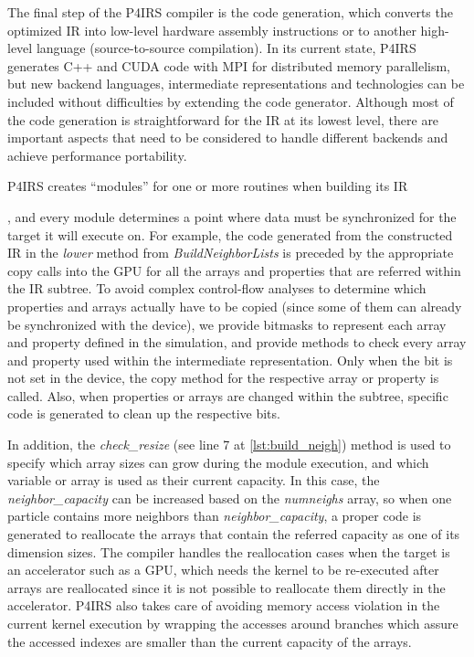 \documentclass[Afour,sageh,times]{sagej}
\newcommand{\RMchange}[1]{{\color{blue} #1}}
\begin{document}
\RMchange{
The final step of the P4IRS compiler is the code generation, which converts the optimized \ac{IR} into low-level hardware assembly instructions or to another high-level language (source-to-source compilation).
In its current state, P4IRS generates C++ and CUDA code with MPI for distributed memory parallelism, but new backend languages, intermediate representations and technologies can be included without difficulties by extending the code generator.
Although most of the code generation is straightforward for the \ac{IR} at its lowest level, there are important aspects that need to be considered to handle different backends and achieve performance portability.

P4IRS creates ``modules'' for one or more routines when building its IR}, and every module determines a point where data must be synchronized for the target it will execute on.
For example, the code generated from the constructed IR in the \emph{lower} method from \emph{BuildNeighborLists} is preceded by the appropriate copy calls into the GPU for all the arrays and properties that are referred within the IR subtree.
To avoid complex control-flow analyses to determine which properties and arrays actually have to be copied (since some of them can already be synchronized with the device), we provide bitmasks to represent each array and property defined in the simulation, and provide methods to check every array and property used within the intermediate representation.
Only when the bit is not set in the device, the copy method for the respective array or property is called.
Also, when properties or arrays are changed within the subtree, specific code is generated to clean up the respective bits.

\RMchange{In addition,} the \emph{check\_resize} (see line 7 at \autoref{lst:build_neigh}) method is used to specify which array sizes can grow during the module execution, and which variable or array is used as their current capacity.
In this case, the \emph{neighbor\_capacity} can be increased based on the \emph{numneighs} array, so when one particle contains more neighbors than \emph{neighbor\_capacity}, a proper code is generated to reallocate the arrays that contain the referred capacity as one of its dimension sizes.
The compiler handles the reallocation cases when the target is an accelerator such as a GPU, which needs the kernel to be re-executed after arrays are reallocated since it is not possible to reallocate them directly in the accelerator.
P4IRS also takes care of avoiding memory access violation in the current kernel execution by wrapping the accesses around branches which assure the accessed indexes are smaller than the current capacity of the arrays.
\end{document}
